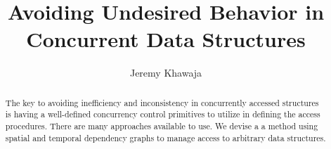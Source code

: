 \documentclass[english]{article}
\begin{document}
	
\hypersetup{
	linktoc=all,     %
	linkcolor=blue,  %
}

\title{Avoiding Undesired Behavior in Concurrent Data Structures}
\author{Jeremy Khawaja}
\maketitle

\begin{abstract}
		The key to avoiding inefficiency and inconsistency in concurrently accessed structures is having a well-defined concurrency control primitives to utilize in defining the access procedures. There are many approaches available to use. We devise a a method using spatial and temporal dependency graphs to manage access to arbitrary data structures.
\end{abstract}
\twocolumn



%
%
%


\end{document}
